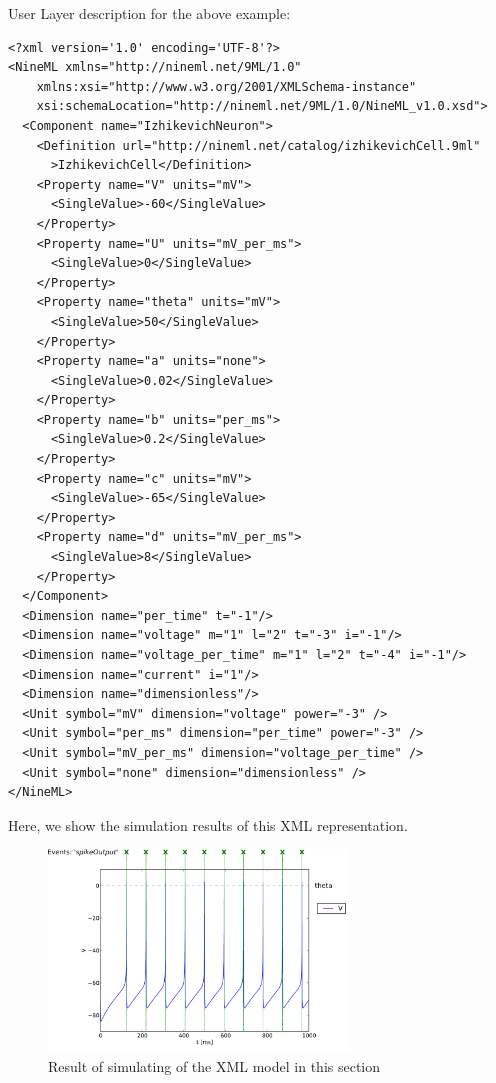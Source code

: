 \documentclass[draftspec]{ninemlspec}
\begin{document}
\clearpage
User Layer description for the above example:

\begin{lstlisting}
<?xml version='1.0' encoding='UTF-8'?>
<NineML xmlns="http://nineml.net/9ML/1.0"
    xmlns:xsi="http://www.w3.org/2001/XMLSchema-instance"
    xsi:schemaLocation="http://nineml.net/9ML/1.0/NineML_v1.0.xsd">
  <Component name="IzhikevichNeuron">
    <Definition url="http://nineml.net/catalog/izhikevichCell.9ml"
      >IzhikevichCell</Definition>
    <Property name="V" units="mV">
      <SingleValue>-60</SingleValue>
    </Property>
    <Property name="U" units="mV_per_ms">
      <SingleValue>0</SingleValue>
    </Property>
    <Property name="theta" units="mV">
      <SingleValue>50</SingleValue>
    </Property>
    <Property name="a" units="none">
      <SingleValue>0.02</SingleValue>
    </Property>
    <Property name="b" units="per_ms">
      <SingleValue>0.2</SingleValue>
    </Property>
    <Property name="c" units="mV">
      <SingleValue>-65</SingleValue>
    </Property>
    <Property name="d" units="mV_per_ms">
      <SingleValue>8</SingleValue>
    </Property>
  </Component>
  <Dimension name="per_time" t="-1"/>
  <Dimension name="voltage" m="1" l="2" t="-3" i="-1"/>
  <Dimension name="voltage_per_time" m="1" l="2" t="-4" i="-1"/>
  <Dimension name="current" i="1"/>
  <Dimension name="dimensionless"/>
  <Unit symbol="mV" dimension="voltage" power="-3" />
  <Unit symbol="per_ms" dimension="per_time" power="-3" />
  <Unit symbol="mV_per_ms" dimension="voltage_per_time" />
  <Unit symbol="none" dimension="dimensionless" />
</NineML>
\end{lstlisting}

Here, we show the simulation results of this XML representation.
\begin{figure}[htb!]
\center
\includegraphics[width=8cm]{figures/example_IzVoltageWave.pdf}
\protect\caption{Result of simulating of the XML model in
this section}
\label{fig:Ex1_Output}
\end{figure}
\end{document}
